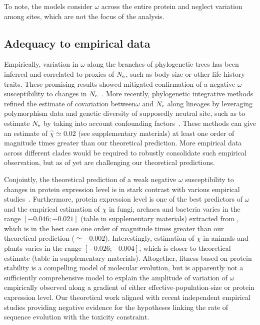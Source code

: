 To note, the models consider $\omega$ across the entire protein and neglect variation among sites, which are not the focus of the analysis.

\subsection{Adequacy to empirical data}
Empirically, variation in $\omega$ along the branches of phylogenetic trees has been inferred and correlated to proxies of $N_{\mathrm{e}}$, such as body size or other life-history traits.
These promising results showed mitigated confirmation of a negative $\omega$ susceptibility to changes in $N_{\mathrm{e}}$~\citep{Lanfear2014}.
More recently, phylogenetic integrative methods refined the estimate of covariation between$\omega$ and $N_{\mathrm{e}}$ along lineages by leveraging polymorphism data and genetic diversity of supposedly \gls{neutral} site, such as to estimate $N_{\mathrm{e}}$ by taking into account confounding factors~\citep{Brevet2019}.
These methods can give an estimate of $\hat{\chi} \simeq 0.02$ (see supplementary materials) at least one order of magnitude times greater than our theoretical prediction.
More empirical data across different clades would be required to robustly consolidate such empirical observation, but as of yet are challenging our theoretical predictions.

Conjointly, the theoretical prediction of a weak negative $\omega$ susceptibility to changes in protein expression level is in stark contrast with various empirical studies~\citep{Duret2000, Rocha2004, Wang2011, Song2017}.
Furthermore, protein expression level is one of the best predictors of $\omega$ and the empirical estimation of $\chi$ in fungi, archaea and bacteria varies in the range $[-0.046;-0.021]$ (table in supplementary materials) extracted from  \citet{Zhang2015}, which is in the best case one order of magnitude times greater than our theoretical prediction ($\simeq -0.002$).
Interestingly, estimation of $\chi$ in animals and plants varies in the range $[-0.026;-0.004]$, which is closer to theoretical estimate (table in supplementary materials). Altogether, fitness based on protein stability is a compelling model of molecular evolution, but is apparently not a sufficiently comprehensive model to explain the amplitude of variation of $\omega$ empirically observed along a gradient of either \gls{effective-population-size} or protein expression level.
Our theoretical work aligned with recent independent empirical studies providing negative evidence for the hypotheses linking the rate of sequence evolution with the toxicity constraint\citep{Plata2017,Razban2019,Biesiadecka2020}.

